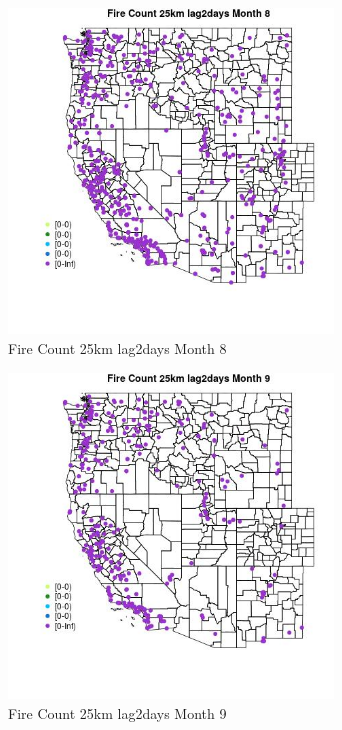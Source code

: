 \begin{figure} 
\centering  
\includegraphics[width=0.77\textwidth]{Code_Outputs/Report_ML_input_PM25_Step4_part_e_de_duplicated_aves_compiled_2019-05-18wNAs_MapObsMo8Fire_Count_25km_lag2days.jpg} 
\caption{\label{fig:Report_ML_input_PM25_Step4_part_e_de_duplicated_aves_compiled_2019-05-18wNAsMapObsMo8Fire_Count_25km_lag2days}Fire Count 25km lag2days Month 8} 
\end{figure} 
 

\clearpage 

\begin{figure} 
\centering  
\includegraphics[width=0.77\textwidth]{Code_Outputs/Report_ML_input_PM25_Step4_part_e_de_duplicated_aves_compiled_2019-05-18wNAs_MapObsMo9Fire_Count_25km_lag2days.jpg} 
\caption{\label{fig:Report_ML_input_PM25_Step4_part_e_de_duplicated_aves_compiled_2019-05-18wNAsMapObsMo9Fire_Count_25km_lag2days}Fire Count 25km lag2days Month 9} 
\end{figure} 
 

